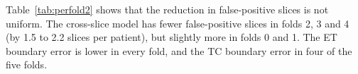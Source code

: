 \begin{table}[htbp]\centering\small
\caption{Per-fold boundary error for TC and ET and false-positive slices per patient}\label{tab:perfold2}
\end{table}

Table~\ref{tab:perfold2} shows that the reduction in false-positive slices is not uniform. The cross-slice model has fewer false-positive slices in folds 2, 3 and 4 (by 1.5 to 2.2 slices per patient), but slightly more in folds 0 and 1. The ET boundary error is lower in every fold, and the TC boundary error in four of the five folds.

